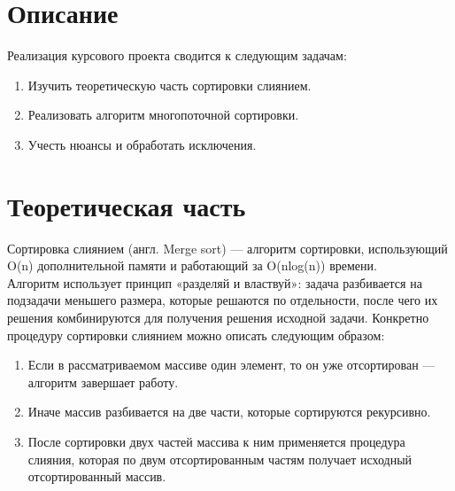 \section{Описание} 
Реализация курсового проекта сводится к следующим задачам:
\begin{enumerate}
    \item Изучить теоретическую часть сортировки слиянием.
    \item Реализовать алгоритм многопоточной сортировки.
    \item Учесть нюансы и обработать исключения.
\end{enumerate}
\pagebreak

\section{Теоретическая часть}
Сортировка слиянием (англ. Merge sort) — алгоритм сортировки, использующий O(n) дополнительной памяти и работающий за O(nlog(n)) времени.
\\
Алгоритм использует принцип «разделяй и властвуй»: задача разбивается на подзадачи меньшего размера, которые решаются по отдельности, после чего их решения комбинируются для получения решения исходной задачи. Конкретно процедуру сортировки слиянием можно описать следующим образом:
\begin{enumerate}
    \item Если в рассматриваемом массиве один элемент, то он уже отсортирован — алгоритм завершает работу.
    \item Иначе массив разбивается на две части, которые сортируются рекурсивно.
    \item После сортировки двух частей массива к ним применяется процедура слияния, которая по двум отсортированным частям получает исходный отсортированный массив.
\end{enumerate}

